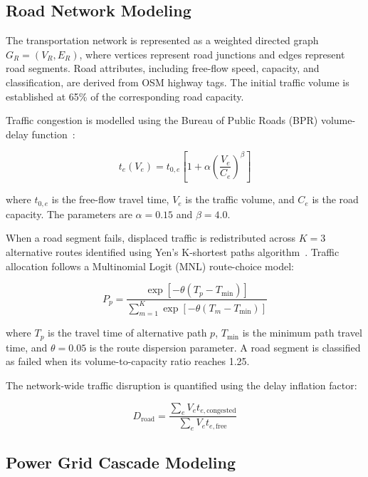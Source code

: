 \documentclass[oneside]{ieeeaccess}
\begin{document}
\subsection{Road Network Modeling}

The transportation network is represented as a weighted directed graph $G_R=(V_R,E_R)$, where vertices represent road junctions and edges represent road segments. Road attributes, including free-flow speed, capacity, and classification, are derived from OSM highway tags. The initial traffic volume is established at 65\% of the corresponding road capacity.

Traffic congestion is modelled using the Bureau of Public Roads (BPR) volume-delay function~\cite{b15}:

\begin{equation}
t_e(V_e)=t_{0,e}\left[1+\alpha
\left(\frac{V_e}{C_e}\right)^\beta\right]
\label{eq:bpr}
\end{equation}

where $t_{0,e}$ is the free-flow travel time, $V_e$ is the traffic volume, and $C_e$ is the road capacity. The parameters are $\alpha=0.15$ and $\beta=4.0$.

When a road segment fails, displaced traffic is redistributed across $K=3$ alternative routes identified using Yen's K-shortest paths algorithm~\cite{b14}. Traffic allocation follows a Multinomial Logit (MNL) route-choice model:

\begin{equation}
P_p=
\frac{\exp[-\theta(T_p-T_{\min})]}
{\sum_{m=1}^{K}\exp[-\theta(T_m-T_{\min})]}
\label{eq:mnl}
\end{equation}

where $T_p$ is the travel time of alternative path $p$, $T_{\min}$ is the minimum path travel time, and $\theta=0.05$ is the route dispersion parameter. A road segment is classified as failed when its volume-to-capacity ratio reaches 1.25.

The network-wide traffic disruption is quantified using the delay inflation factor:

\begin{equation}
D_{\mathrm{road}}=
\frac{\sum_e V_e t_{e,\mathrm{congested}}}
{\sum_e V_e t_{e,\mathrm{free}}}
\label{eq:delay}
\end{equation}

\subsection{Power Grid Cascade Modeling}
\end{document}
